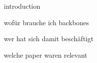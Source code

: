 introduction

wofür brauche ich backbones

wer hat sich damit beschäftigt

welche paper waren relevant